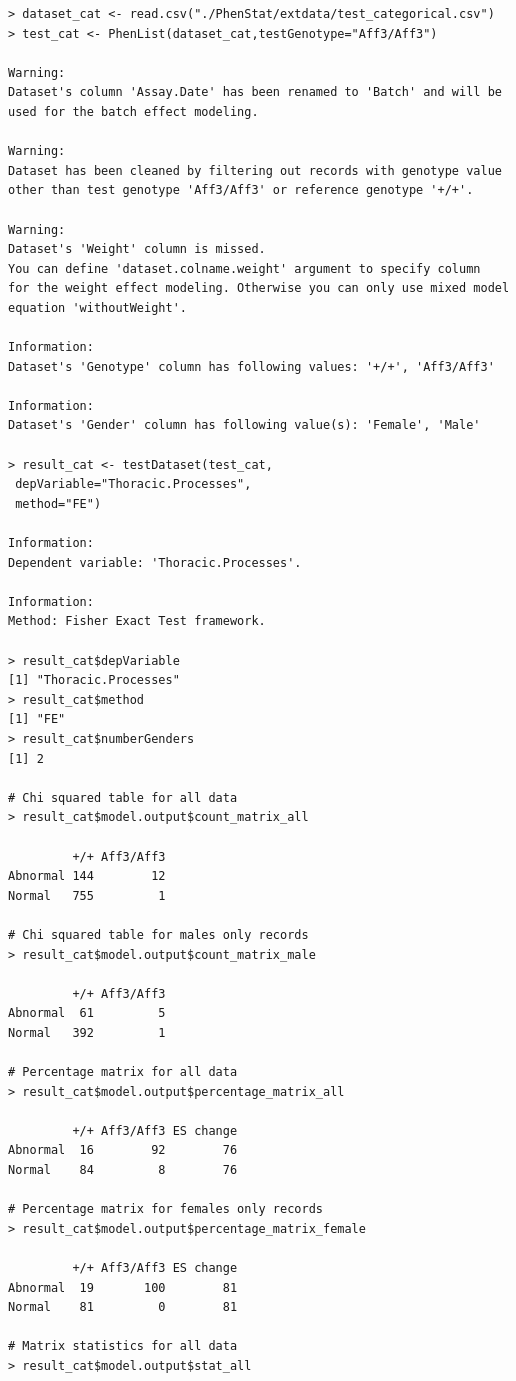 \documentclass[12pt,a4paper]{article}
\begin{document}
\begingroup
    \fontsize{8pt}{12pt}\selectfont
\begin{verbatim}
> dataset_cat <- read.csv("./PhenStat/extdata/test_categorical.csv")
> test_cat <- PhenList(dataset_cat,testGenotype="Aff3/Aff3")
 
Warning:
Dataset's column 'Assay.Date' has been renamed to 'Batch' and will be used for the batch effect modeling.

Warning:
Dataset has been cleaned by filtering out records with genotype value 
other than test genotype 'Aff3/Aff3' or reference genotype '+/+'.

Warning:
Dataset's 'Weight' column is missed.
You can define 'dataset.colname.weight' argument to specify column 
for the weight effect modeling. Otherwise you can only use mixed model equation 'withoutWeight'.

Information:
Dataset's 'Genotype' column has following values: '+/+', 'Aff3/Aff3'

Information:
Dataset's 'Gender' column has following value(s): 'Female', 'Male'

> result_cat <- testDataset(test_cat,
 depVariable="Thoracic.Processes",
 method="FE")

Information:
Dependent variable: 'Thoracic.Processes'.

Information:
Method: Fisher Exact Test framework.

> result_cat$depVariable
[1] "Thoracic.Processes"
> result_cat$method
[1] "FE"
> result_cat$numberGenders
[1] 2

# Chi squared table for all data
> result_cat$model.output$count_matrix_all

         +/+ Aff3/Aff3
Abnormal 144        12
Normal   755         1

# Chi squared table for males only records
> result_cat$model.output$count_matrix_male

         +/+ Aff3/Aff3
Abnormal  61         5
Normal   392         1

# Percentage matrix for all data
> result_cat$model.output$percentage_matrix_all

         +/+ Aff3/Aff3 ES change
Abnormal  16        92        76
Normal    84         8        76

# Percentage matrix for females only records
> result_cat$model.output$percentage_matrix_female

         +/+ Aff3/Aff3 ES change
Abnormal  19       100        81
Normal    81         0        81

# Matrix statistics for all data
> result_cat$model.output$stat_all


\end{verbatim}
\end{document}
